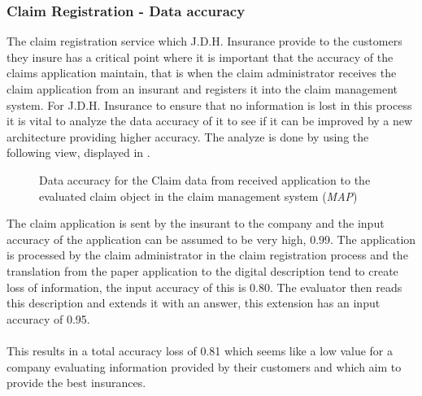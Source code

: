 \subsubsection{Claim Registration - Data accuracy}
\label{sec:claim_analysis}
The claim registration service which J.D.H. Insurance provide to the customers they insure has a critical point where it is important that the accuracy of the claims application maintain, that is when the claim administrator receives the claim application from an insurant and registers it into the claim management system. For J.D.H. Insurance to ensure that no information is lost in this process it is vital to analyze the data accuracy of it to see if it can be improved by a new architecture providing higher accuracy. The analyze is done by using the following view, displayed in .
\begin{center}
	\begin{figure}[H]
		\centering
		\setlength\fboxsep{7pt}
		\setlength\fboxrule{0.5pt}
		\caption{Data accuracy for the Claim data from received application to the evaluated claim object in the claim management system (\emph{MAP})}
		\label{fig:map_claim_data}
	\end{figure}
\end{center}
The claim application is sent by the insurant to the company and the input accuracy of the application can be assumed to be very high, 0.99. The application is processed by the claim administrator in the claim registration process and the translation from the paper application to the digital description tend to create loss of information, the input accuracy of this is 0.80. The evaluator then reads this description and extends it with an answer, this extension has an input accuracy of 0.95.\\\\
%
This results in a total accuracy loss of 0.81 which seems like a low value for a company evaluating information provided by their customers and which aim to provide the best insurances.
%
